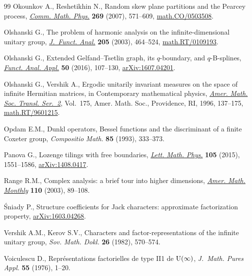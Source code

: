 \documentclass[pdftex]{sigma}
\numberwithin{equation}{section}
\begin{document}
\begin{thebibliography}{99}
Okounkov A., Reshetikhin N., Random skew plane partitions and the {P}earcey
 process, \href{https://doi.org/10.1007/s00220-006-0128-8}{\textit{Comm. Math. Phys.}} \textbf{269} (2007), 571--609,
 \href{https://arxiv.org/abs/math.CO/0503508}{math.CO/0503508}.

Olshanski G., The problem of harmonic analysis on the inf\/inite-dimensional
 unitary group, \href{https://doi.org/10.1016/S0022-1236(02)00022-8}{\textit{J.~Funct. Anal.}} \textbf{205} (2003), 464--524,
 \href{https://arxiv.org/abs/math.RT/0109193}{math.RT/0109193}.

Olshanski G., Extended {G}elfand--{T}setlin graph, its $q$-boundary, and
 $q$-{B}-splines, \href{https://doi.org/10.1007/s10688-016-0136-1}{\textit{Funct. Anal. Appl.}} \textbf{50} (2016), 107--130,
 \href{https://arxiv.org/abs/1607.04201}{arXiv:1607.04201}.

Olshanski G., Vershik A., Ergodic unitarily invariant measures on the space of
 inf\/inite {H}ermitian matrices, in Contemporary mathematical physics,
 \href{https://doi.org/10.1090/trans2/175/09}{\textit{Amer. Math. Soc. Transl. Ser.~2}}, Vol.~175, Amer. Math. Soc.,
 Providence, RI, 1996, 137--175, \href{https://arxiv.org/abs/math.RT/9601215}{math.RT/9601215}.

Opdam E.M., Dunkl operators, {B}essel functions and the discriminant of a
 f\/inite {C}oxeter group, \textit{Compositio Math.} \textbf{85} (1993),
 333--373.

Panova G., Lozenge tilings with free boundaries, \href{https://doi.org/10.1007/s11005-015-0794-6}{\textit{Lett. Math. Phys.}}
 \textbf{105} (2015), 1551--1586, \href{https://arxiv.org/abs/1408.0417}{arXiv:1408.0417}.

Range R.M., Complex analysis: a brief tour into higher dimensions,
 \href{https://doi.org/10.2307/3647769}{\textit{Amer. Math. Monthly}} \textbf{110} (2003), 89--108.

\'{S}niady P., Structure coef\/f\/icients for {J}ack characters: approximate
 factorization property, \href{https://arxiv.org/abs/1603.04268}{arXiv:1603.04268}.

Vershik A.M., Kerov S.V., Characters and factor-representations of the inf\/inite
 unitary group, \textit{Sov. Math. Dokl.} \textbf{26} (1982), 570--574.

Voiculescu D., Repr\'esentations factorielles de type {II}1 de {${\rm U}(\infty )$},
 \textit{J.~Math. Pures Appl.} \textbf{55} (1976), 1--20.

\end{thebibliography}\LastPageEnding
\end{document}
